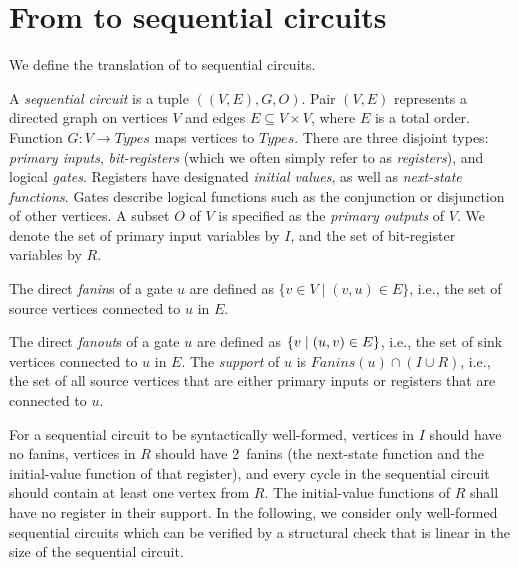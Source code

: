 \section{From \caig to sequential circuits}
\label{sec:sequential}
%
We define the translation of \caig to sequential circuits.
%
\begin{definition}
A {\em sequential circuit} is a tuple $\left( (V, E),G,
O\right)$.
Pair $(V,E)$ represents a directed graph on
vertices $V$ and edges $E \subseteq V\times V$, where $E$
is a total order.  Function $G: V \to
\mathit{Types}$ maps vertices to $\mathit{Types}$.
There are three disjoint types: {\em primary inputs}, {\em
bit-registers} (which we often simply refer to as {\em
registers}), and logical {\em gates}.  Registers have designated
{\em initial values}, as well as {\em next-state
functions}.  Gates describe logical functions such as
the conjunction or disjunction of other vertices. 
A subset $O$ of $V$ is specified as the {\em
primary outputs} of $V$.  
We denote the set of primary input variables by $I$,
and the set of bit-register variables by $R$.  
\label{def:back:seq_circuit}
\end{definition}
%
\begin{definition}
The direct \emph{fanin}s of a gate $u$ 
are defined as
$\{v \in V \mid (v,u)\in E\}$, i.e., the set of source vertices connected
to $u$ in $E$.  

The direct {\em fanout}s of a gate $u$ are defined as 
$\{ v \mid (u,v) \in E \}$, i.e., 
  the set of sink vertices connected
to $u$ in $E$.
The {\em support} of $u$ 
is $\mathit{Fanins}(u) \cap (I \cup R)$, i.e., the set of all source vertices that are either primary inputs or registers that are connected to $u$.
\label{def:back:fanins} 
\end{definition}
%
%
For a sequential
circuit to be syntactically well-formed, vertices in $I$
should have no fanins, vertices in $R$ should have
2~fanins (the next-state function and the initial-value
function of that register), %
and every cycle in the sequential circuit should contain
at least one vertex from $R$.  The initial-value functions
of $R$ shall have no register in their support.  
In the following, 
we consider only well-formed sequential circuits which can be 
verified by a structural check that is linear in the size of the 
sequential circuit.
%

